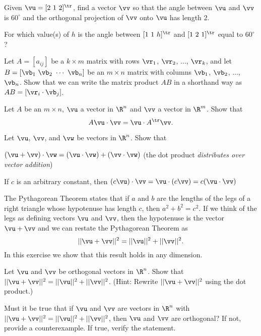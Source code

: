\item Given $\vu=[2 \ 1\ 2]^\tr$, find a vector $\vv$ so that the angle between $\vu$ and $\vv$ is $60^\circ$ and the orthogonal projection of $\vv$ onto $\vu$ has length 2.


\item For which value(s) of $h$ is the angle between $[1\ 1\ h]^\tr$ and $[1\ 2\ 1]^\tr$ equal to $60^\circ$?

\item Let $A = [a_{ij}]$ be a $k \times m$ matrix with rows $\vr_1$, $\vr_2$, $\ldots$, $\vr_k$, and let $B =  [\vb_1 \ \vb_2 \ \cdots \ \vb_n]$ be an $m \times n$ matrix with columns $\vb_1$, $\vb_2$, $\ldots$, $\vb_n$. Show that we can write the matrix product $AB$ in a shorthand way as $AB = [\vr_i \cdot \vb_j]$. 


\item Let $A$ be an $m \times n$, $\vu$ a vector in $\R^n$ and $\vv$ a vector in $\R^m$. Show that 
\[A\vu \cdot \vv = \vu \cdot A^{\tr} \vv.\]


\item Let $\vu$, $\vv$, and $\vw$ be vectors in $\R^n$. Show that 
	\ba
	\item $(\vu + \vv) \cdot \vw = (\vu \cdot \vw) + (\vv \cdot \vw)$ (the dot product \emph{distributes over vector addition})
	\item If $c$ is an arbitrary constant, then $(c\vu) \cdot \vv = \vu \cdot (c\vv) = c(\vu \cdot \vv)$
	\ea

\item \label{ex:Pyth_Thm} The Pythagorean Theorem states that if $a$ and $b$ are the lengths of the legs of a right triangle whose hypotenuse has length $c$, then $a^2+b^2=c^2$. If we think of the legs as defining vectors $\vu$ and $\vv$, then the hypotenuse is the vector $\vu+\vv$ and we can restate the Pythagorean Theorem as 
\[||\vu+\vv||^2 = ||\vu||^2+||\vv||^2.\]
In this exercise we show that this result holds in any dimension.
	\ba
	\item Let $\vu$ and $\vv$ be orthogonal vectors in $\R^n$. Show that $||\vu+\vv||^2 = ||\vu||^2+||\vv||^2$. (Hint: Rewrite $||\vu+\vv||^2$ using the dot product.)  
	\item Must it be true that if $\vu$ and $\vv$ are vectors in $\R^n$ with $||\vu+\vv||^2 = ||\vu||^2+||\vv||^2$, then $\vu$ and $\vv$ are orthogonal? If not, provide a counterexample. If true, verify the statement.
	\ea
	
